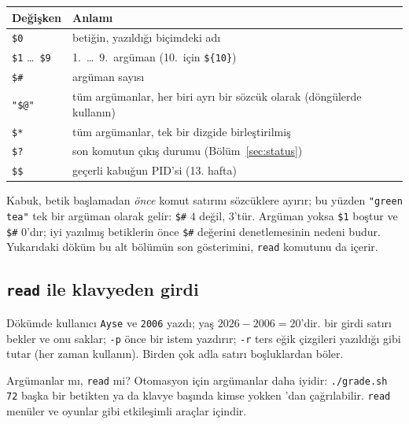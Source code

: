 


\begin{center}
\small
\begin{tabular}{@{}ll@{}}
\toprule
\textbf{Değişken} & \textbf{Anlamı}\\
\midrule
\texttt{\$0} & betiğin, yazıldığı biçimdeki adı\\
\texttt{\$1} \ldots\ \texttt{\$9} & 1.\ \ldots\ 9.\ argüman (10.\ için \texttt{\$\{10\}})\\
\texttt{\$\#} & argüman sayısı\\
\texttt{"\$@"} & tüm argümanlar, her biri ayrı bir sözcük olarak (döngülerde kullanın)\\
\texttt{\$*} & tüm argümanlar, tek bir dizgide birleştirilmiş\\
\texttt{\$?} & son komutun çıkış durumu (Bölüm~\ref{sec:status})\\
\texttt{\$\$} & geçerli kabuğun PID'si (13. hafta)\\
\bottomrule
\end{tabular}
\end{center}

Kabuk, betik başlamadan \emph{önce} komut satırını sözcüklere ayırır; bu yüzden \texttt{"green tea"} tek bir argüman olarak gelir: \texttt{\$\#} $4$ değil, $3$'tür. Argüman yoksa \texttt{\$1} boştur ve \texttt{\$\#} $0$'dır; iyi yazılmış betiklerin önce \texttt{\$\#} değerini denetlemesinin nedeni budur. Yukarıdaki döküm bu alt bölümün son gösterimini, \texttt{read} komutunu da içerir.

\subsection{\texttt{read} ile klavyeden girdi}



Dökümde kullanıcı \texttt{Ayse} ve \texttt{2006} yazdı; yaş $2026 - 2006 = 20$'dir.  bir girdi satırı bekler ve onu saklar; \texttt{-p} önce bir istem yazdırır; \texttt{-r} ters eğik çizgileri yazıldığı gibi tutar (her zaman kullanın). Birden çok adla  satırı boşluklardan böler.

Argümanlar mı, \texttt{read} mi? Otomasyon için argümanlar daha iyidir: \texttt{./grade.sh 72} başka bir betikten ya da klavye başında kimse yokken 'dan çağrılabilir. \texttt{read} menüler ve oyunlar gibi etkileşimli araçlar içindir.


